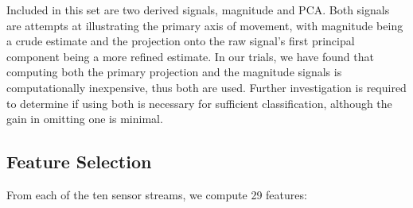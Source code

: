 Included in this set are two derived signals, magnitude and PCA. Both signals are attempts at illustrating the primary axis of movement, with magnitude being a crude estimate and the projection onto the raw signal's first principal component being a more refined estimate. In our trials, we have found that computing both the primary projection and the magnitude signals is computationally inexpensive, thus both are used. Further investigation is required to determine if using both is necessary for sufficient classification, although the gain in omitting one is minimal.

\subsection{Feature Selection} 
From each of the ten sensor streams, we compute 29 features: 

